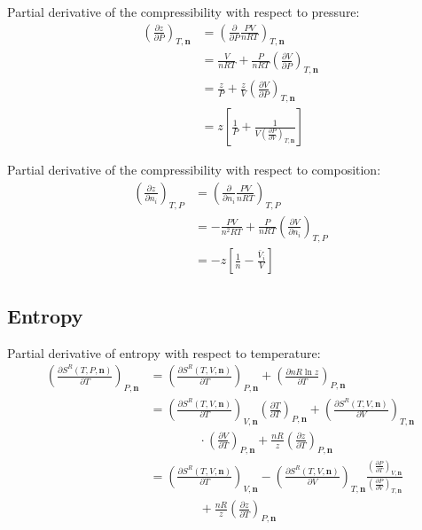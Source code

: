 \documentclass[english]{../thermomemo/thermomemo}
\numberwithin{equation}{section}
\newcommand*{\pder}[2]{\left(\frac{\partial #1}{\partial #2}\right)}
\begin{document}
Partial derivative of the compressibility with respect to pressure:
\begin{equation}
\begin{split}
\left( \frac{\partial z}{\partial P} \right)_{T, \textbf{n}}
& = \left( \frac{\partial }{\partial P} \frac{PV}{nRT} \right)_{T, \textbf{n}} \\
& = \frac{V}{nRT} + \frac{P}{nRT} \left( \frac{\partial V}{\partial P} \right)_{T, \textbf{n}} \\
& = \frac{z}{P} + \frac{z}{V} \left( \frac{\partial V}{\partial P} \right)_{T, \textbf{n}} \\
& = z \left[ \frac{1}{P} + \frac{1}{V \pder{P}{V}_{T,\textbf{n}}} \right]
\end{split}
\end{equation}

Partial derivative of the compressibility with respect to composition:
\begin{equation}
\begin{split}
\left( \frac{\partial z}{\partial n_i} \right)_{T,P}
& = \left( \frac{\partial }{\partial n_i} \frac{PV}{nRT} \right)_{T,P} \\
& = - \frac{PV}{n^2RT} + \frac{P}{nRT} \left( \frac{\partial V}{\partial n_i} \right)_{T,P} \\
& = - z \left[ \frac{1}{n} - \frac{\bar{V}_i}{V}  \right]
\end{split}
\end{equation}

\subsection{Entropy}

Partial derivative of entropy with respect to temperature:
\begin{equation}
\begin{split}
\left( \frac{\partial S^R(T,P,\textbf{n})}{\partial T} \right)_{P,\textbf{n}}
& = \left( \frac{\partial S^R(T,V, \textbf{n})}{\partial T} \right)_{P,\textbf{n}} + \left( \frac{\partial nR \ln z}{\partial T} \right)_{P,\textbf{n}} \\
& = \pder{S^R(T,V,\textbf{n})}{T}_{V,\textbf{n}} \pder{T}{T}_{P,\textbf{n}} + \pder{S^R(T,V,\textbf{n})}{V}_{T,\textbf{n}} \\
& \qquad \qquad \cdot \pder{V}{T}_{P,\textbf{n}} + \frac{nR}{z} \pder{z}{T}_{P,\textbf{n}} \\
& = \pder{S^R(T,V,\textbf{n})}{T}_{V,\textbf{n}} - \pder{S^R(T,V,\textbf{n})}{V}_{T,\textbf{n}} \frac{\pder{P}{T}_{V,\textbf{n}}}{\pder{P}{V}_{T,\textbf{n}}} \\
& \qquad \qquad + \frac{nR}{z} \pder{z}{T}_{P,\textbf{n}} 
\end{split}
\end{equation}
\end{document}
